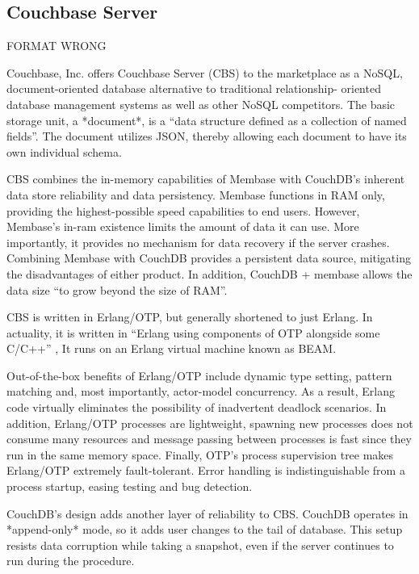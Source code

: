 \subsection{Couchbase Server \cv}

     FORMAT WRONG

     Couchbase, Inc. offers Couchbase Server (CBS) to the marketplace
     as a NoSQL, document-oriented database alternative to traditional
     relationship- oriented database management systems as well as
     other NoSQL competitors.  The basic storage unit, a *document*,
     is a ``data structure defined as a collection of named fields''.
     The document utilizes JSON, thereby allowing each document to
     have its own individual schema. \cite{www-infoworld-cbs}

     CBS combines the in-memory capabilities of Membase with CouchDB's
     inherent data store reliability and data persistency.  Membase
     functions in RAM only, providing the highest-possible speed
     capabilities to end users.  However, Membase's in-ram existence
     limits the amount of data it can use.  More importantly, it
     provides no mechanism for data recovery if the server crashes.
     Combining Membase with CouchDB provides a persistent data source,
     mitigating the disadvantages of either product.  In addition,
     CouchDB + membase allows the data size ``to grow beyond the size
     of RAM''.  \cite{www-safaribooks-cbs}

     CBS is written in Erlang/OTP, but generally shortened to just
     Erlang.  In actuality, it is written in ``Erlang using components
     of OTP alongside some C/C++'' \cite{www-erlangcentral-cbs}, It
     runs on an Erlang virtual machine known as
     BEAM. \cite{www-wikipedia-erlang-cbs}

     Out-of-the-box benefits of Erlang/OTP include dynamic type
     setting, pattern matching and, most importantly, actor-model
     concurrency.  As a result, Erlang code virtually eliminates the
     possibility of inadvertent deadlock scenarios.  In addition,
     Erlang/OTP processes are lightweight, spawning new processes does
     not consume many resources and message passing between processes
     is fast since they run in the same memory space.  Finally, OTP's
     process supervision tree makes Erlang/OTP extremely
     fault-tolerant.  Error handling is indistinguishable from a
     process startup, easing testing and bug detection.
     \cite{www-couchbase-blog-cbs}

     CouchDB's design adds another layer of reliability to CBS.
     CouchDB operates in *append-only* mode, so it adds user changes
     to the tail of database.  This setup resists data corruption
     while taking a snapshot, even if the server continues to run
     during the procedure.  \cite{www-hightower-cbs}

